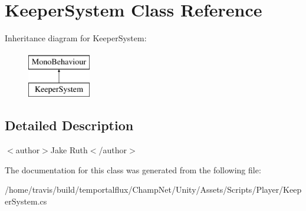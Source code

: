 \hypertarget{class_keeper_system}{\section{Keeper\-System Class Reference}
\label{class_keeper_system}
}


 


Inheritance diagram for Keeper\-System\-:\begin{figure}[H]
\begin{center}
\leavevmode
\includegraphics[height=2.000000cm]{class_keeper_system}
\end{center}
\end{figure}


\subsection{Detailed Description}


$<$author$>$Jake Ruth$<$/author$>$ 

The documentation for this class was generated from the following file\-:\begin{DoxyCompactItemize}
\item 
/home/travis/build/temportalflux/\-Champ\-Net/\-Unity/\-Assets/\-Scripts/\-Player/Keeper\-System.\-cs\end{DoxyCompactItemize}
